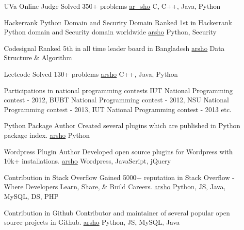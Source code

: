 \documentclass[10pt,a4paper]{altacv}
\begin{document}
\medskip

\medskip

\cvprogramming
{UVa Online Judge}
{Solved 350+ problems}
{\href{https://uhunt.onlinejudge.org/id/141799}{ar\_sho}}
{C, C++, Java, Python}
\divider

\cvprogramming
{Hackerrank Python Domain and Security Domain}
{Ranked 1st in Hackerrank Python domain and Security domain worldwide}
{\href{https://www.hackerrank.com/leaderboard?filter=arsho&filter_on=hacker&page=1&track=python&type=practice}{arsho}}
{Python, Security}
\divider

\cvprogramming
{Codesignal}
{Ranked 5th in all time leader board in Bangladesh}
{\href{https://app.codesignal.com/leaderboard/?type=individual&period=total&country=BD}{arsho}}
{Data Structure \& Algorithm}
\divider

\cvprogramming
{Leetcode}
{Solved 130+ problems}
{\href{https://leetcode.com/arsho/}{arsho}}
{C++, Java, Python}
\divider

\cvonsitecontest
{Participations in national programming contests}
{IUT National Programming
contest - 2012, BUBT National Programming
contest - 2012, NSU National Programming
contest - 2013, IUT National Programming
contest - 2013 etc.}

\medskip

\cvprogramming
{Python Package Author}
{Created several plugins which are published in Python package index.}
{\href{https://pypi.org/user/arsho/}{arsho}}
{Python}
\divider

\cvprogramming
{Wordpress Plugin Author}
{Developed open source plugins for Wordpress with 10k+ installations.}
{\href{https://profiles.wordpress.org/arsho/}{arsho}}
{Wordpress, JavaScript, jQuery}
\divider

\cvprogramming
{Contribution in Stack Overflow}
{Gained 5000+ reputation in Stack Overflow - Where Developers Learn, Share, \& Build Careers.}
{\href{https://stackoverflow.com/users/3129414/arsho}{arsho}}
{Python, JS, Java, MySQL, DS, PHP}
\divider

\cvprogramming
{Contribution in Github}
{Contributor and maintainer of several popular open source projects in Github.}
{\href{https://github.com/arsho/}{arsho}}
{Python, JS, MySQL, Java}


\end{document}
